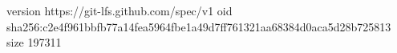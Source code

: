 version https://git-lfs.github.com/spec/v1
oid sha256:c2e4f961bbfb77a14fea5964fbe1a49d7ff761321aa68384d0aca5d28b725813
size 197311
